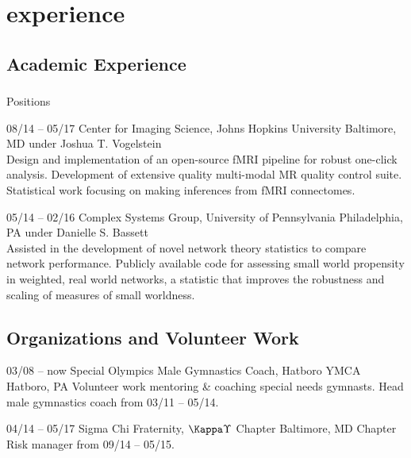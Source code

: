 \documentclass[]{friggeri-cv} %
\begin{document}

\section{experience}

\subsection{Academic Experience}

\subsubsection{}{Positions}

\begin{entrylist}
\entry
{08/14 -- 05/17}
{Center for Imaging Science, Johns Hopkins University}
{Baltimore, MD}
{ under Joshua T. Vogelstein\\
Design and implementation of an open-source fMRI pipeline for robust one-click analysis. Development of extensive quality multi-modal MR quality control suite. Statistical work focusing on making inferences from fMRI connectomes.}

\entry
{05/14 -- 02/16}
{Complex Systems Group, University of Pennsylvania}
{Philadelphia, PA}
{ under Danielle S. Bassett\\
Assisted in the development of novel network theory statistics to compare network performance. Publicly available code for assessing small world propensity in weighted, real world networks, a statistic that improves the robustness and scaling of measures of small worldness.}
\end{entrylist}


\subsection{Organizations and Volunteer Work}

\begin{entrylist}
\entry
{03/08 -- now}
{Special Olympics Male Gymnastics Coach, Hatboro YMCA}
{Hatboro, PA}
{Volunteer work mentoring \& coaching special needs gymnasts. Head male gymnastics coach from 03/11 -- 05/14.}

\entry
{04/14 -- 05/17}
{Sigma Chi Fraternity, $\Kappa\Upsilon$ Chapter}
{Baltimore, MD}
{Chapter Risk manager from 09/14 -- 05/15.}

\end{entrylist}
\end{document}

